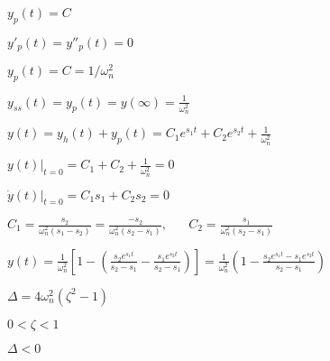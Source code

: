 \documentclass{article}
\def\lthtmlcheckvsize{\ifdim\ht\sizebox<\vsize 
  \ifdim\wd\sizebox<\hsize\expandafter\hfill\fi \expandafter\vfill
  \else\expandafter\vss\fi}%
\begin{document}
{\newpage\clearpage
{}%
$ y_p(t)=C$%
\lthtmlindisplaymathZ
\lthtmlcheckvsize\clearpage}

{\newpage\clearpage
{}%
$ y'_p(t)=y''_p(t)=0$%
\lthtmlindisplaymathZ
\lthtmlcheckvsize\clearpage}

{\newpage\clearpage
{}%
$ y_p(t)=C=1/\omega_n^2$%
\lthtmlindisplaymathZ
\lthtmlcheckvsize\clearpage}

{\newpage\clearpage
{}%
$\displaystyle y_{ss}(t)=y_p(t)=y(\infty)=\frac{1}{\omega_n^2}$%
\lthtmlindisplaymathZ
\lthtmlcheckvsize\clearpage}

{\newpage\clearpage
{}%
$\displaystyle y(t)=y_h(t)+y_p(t)=C_1 e^{s_1t}+C_2 e^{s_2t}+\frac{1}{\omega_n^2}$%
\lthtmlindisplaymathZ
\lthtmlcheckvsize\clearpage}

{\newpage\clearpage
{}%
$\displaystyle y(t)\bigg|_{t=0}=C_1+C_2+\frac{1}{\omega_n^2}=0$%
\lthtmlindisplaymathZ
\lthtmlcheckvsize\clearpage}

{\newpage\clearpage
{}%
$\displaystyle \dot{y}(t)\bigg|_{t=0}=C_1s_1+C_2s_2=0$%
\lthtmlindisplaymathZ
\lthtmlcheckvsize\clearpage}

{\newpage\clearpage
{}%
$\displaystyle C_1=\frac{s_2}{\omega_n^2(s_1-s_2)}=\frac{-s_2}{\omega_n^2(s_2-s_1)},
\;\;\;\;\;\;C_2=\frac{s_1}{\omega_n^2(s_2-s_1)}$%
\lthtmlindisplaymathZ
\lthtmlcheckvsize\clearpage}

{\newpage\clearpage
{}%
$\displaystyle y(t)=\frac{1}{\omega_n^2}\left[1-\left(\frac{s_2e^{s_1t}}{s_2-s_1}
-\frac{s_1e^{s_2t}}{s_2-s_1}\right)\right]
=\frac{1}{\omega_n^2}\left(1-\frac{s_2e^{s_1t}-s_1e^{s_2t}}{s_2-s_1}\right)$%
\lthtmlindisplaymathZ
\lthtmlcheckvsize\clearpage}

{\newpage\clearpage
{}%
$ \Delta=4\omega_n^2(\zeta^2-1)$%
\lthtmlindisplaymathZ
\lthtmlcheckvsize\clearpage}

{\newpage\clearpage
{}%
$ 0 < \zeta < 1$%
\lthtmlindisplaymathZ
\lthtmlcheckvsize\clearpage}

{\newpage\clearpage
{}%
$ \Delta<0$%
\lthtmlindisplaymathZ
\lthtmlcheckvsize\clearpage}
\end{document}
